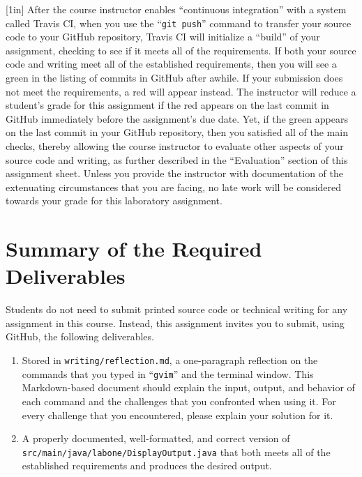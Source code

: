 \documentclass[11pt]{article}
\newcommand{\mainprogramsource}{\lstinline{src/main/java/labone/DisplayOutput.java}}
\newcommand{\reflection}{\lstinline{writing/reflection.md}}
\newcommand{\gitpush}{\command{git push}}
\newcommand{\command}[1]{``\lstinline{#1}''}
\newcommand{\step}[1]{``{#1}''}
\newcommand{\checkmark}{\ding{51}}
\newcommand{\naughtmark}{\ding{55}}
\newcommand{\caution}[1]{\null\hfill\LARGE{\faWarning{}}\newline\scriptsize{\em{#1}}}
\begin{document}
\marginnote{\caution{Verify all checks}}[1in] After the course instructor
enables \step{continuous integration} with a system called Travis CI, when you
use the \gitpush{} command to transfer your source code to your GitHub
repository, Travis CI will initialize a \step{build} of your assignment,
checking to see if it meets all of the requirements. If both your source code
and writing meet all of the established requirements, then you will see a green
\checkmark{} in the listing of commits in GitHub after awhile. If your
submission does not meet the requirements, a red \naughtmark{} will appear
instead. The instructor will reduce a student's grade for this assignment if
the red \naughtmark{} appears on the last commit in GitHub immediately before
the assignment's due date. Yet, if the green \checkmark{} appears on the last
commit in your GitHub repository, then you satisfied all of the main checks,
thereby allowing the course instructor to evaluate other aspects of your source
code and writing, as further described in the \step{Evaluation} section of this
assignment sheet. Unless you provide the instructor with documentation of the
extenuating circumstances that you are facing, no late work will be considered
towards your grade for this laboratory assignment.

\section*{Summary of the Required Deliverables}

\noindent Students do not need to submit printed source code or technical
writing for any assignment in this course. Instead, this assignment invites you
to submit, using GitHub, the following deliverables.

\begin{enumerate}

\setlength{\itemsep}{0in}

\item Stored in \reflection{}, a one-paragraph reflection on the commands that
  you typed in \command{gvim} and the terminal window. This Markdown-based
  document should explain the input, output, and behavior of each command and
  the challenges that you confronted when using it. For every challenge that
  you encountered, please explain your solution for it.

\item A properly documented, well-formatted, and correct version of
  \mainprogramsource{} that both meets all of the established requirements and
  produces the desired output.

\end{enumerate}
\end{document}
